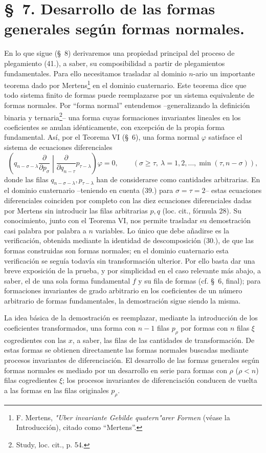 \documentclass[11pt]{article}
\begin{document}
\section*{\S\ 7. Desarrollo de las formas generales según formas normales.}
En lo que sigue (\S\ 8) derivaremos una propiedad principal del proceso de plegamiento (41.), a saber, su composibilidad a partir de plegamientos fundamentales. Para ello necesitamos trasladar al dominio $n$-ario un importante teorema dado por Mertens\footnote{F. Mertens, \emph{"Uber invariante Gebilde quatern"arer Formen} (véase la Introducción), citado como ``Mertens''.} en el dominio cuaternario. Este teorema dice que todo sistema finito de formas puede reemplazarse por un sistema equivalente de formas normales. Por ``forma normal'' entendemos --generalizando la definición binaria y ternaria\footnote{Study, loc. cit., p. 54.}-- una forma cuyas formaciones invariantes lineales en los coeficientes se anulan idénticamente, con excepción de la propia forma fundamental. Así, por el Teorema VI (\S\ 6), una forma normal $\varphi$ satisface el sistema de ecuaciones diferenciales
\begin{equation}
 \left(q_{n-\sigma-\lambda}\frac{\partial}{\partial p_\sigma}\middle|\frac{\partial}{\partial q_{n-\tau}}p_{\tau-\lambda}\right)\varphi=0,
 \qquad(\sigma\ge\tau,\ \lambda=1,2,\ldots,\min(\tau,n-\sigma)),
\tag{46}
\end{equation}
donde las filas $q_{n-\sigma-\lambda},p_{\tau-\lambda}$ han de considerarse como cantidades arbitrarias. En el dominio cuaternario --teniendo en cuenta (39.) para $\sigma=\tau=2$-- estas ecuaciones diferenciales coinciden por completo con las diez ecuaciones diferenciales dadas por Mertens sin introducir las filas arbitrarias $p,q$ (loc. cit., fórmula 28). Su conocimiento, junto con el Teorema VI, nos permite trasladar su demostración casi palabra por palabra a $n$ variables. Lo único que debe añadirse es la verificación, obtenida mediante la identidad de descomposición (30.), de que las formas construidas son formas normales; en el dominio cuaternario esta verificación se seguía todavía sin transformación ulterior. Por ello basta dar una breve exposición de la prueba, y por simplicidad en el caso relevante más abajo, a saber, el de una sola forma fundamental $f$ y su fila de formas (cf. \S\ 6, final); para formaciones invariantes de grado arbitrario en los coeficientes de un número arbitrario de formas fundamentales, la demostración sigue siendo la misma.

La idea básica de la demostración es reemplazar, mediante la introducción de los coeficientes transformados, una forma con $n-1$ filas $p_\rho$ por formas con $n$ filas $\xi$ cogredientes con las $x$, a saber, las filas de las cantidades de transformación. De estas formas se obtienen directamente las formas normales buscadas mediante procesos invariantes de diferenciación. El desarrollo de las formas generales según formas normales es mediado por un desarrollo en serie para formas con $\rho$ ($\rho<n$) filas cogredientes $\xi$; los procesos invariantes de diferenciación conducen de vuelta a las formas en las filas originales $p_\rho$.
\end{document}
